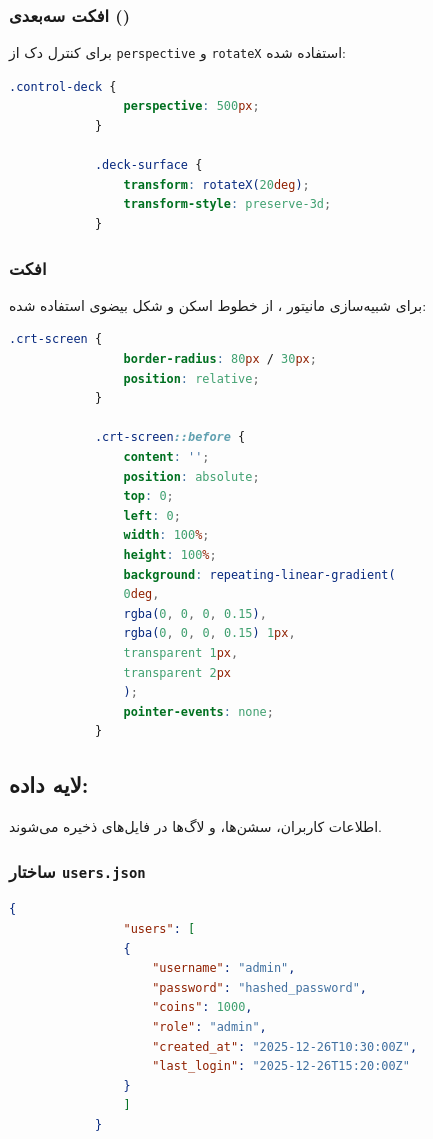 \documentclass[12pt,a4paper]{article}
\begin{document}
	\subsubsection{افکت سه‌بعدی ()}
	برای کنترل دک از \texttt{perspective} و \texttt{rotateX} استفاده شده:
	
	\begin{latin}
		\begin{lstlisting}[language=CSS, caption=افکت سه‌بعدی]
			.control-deck {
				perspective: 500px;
			}
			
			.deck-surface {
				transform: rotateX(20deg);
				transform-style: preserve-3d;
			}
		\end{lstlisting}
	\end{latin}
	
	\subsubsection{افکت }
	برای شبیه‌سازی مانیتور ، از خطوط اسکن و شکل بیضوی استفاده شده:
	
	\begin{latin}
		\begin{lstlisting}[language=CSS, caption=افکت CRT]
			.crt-screen {
				border-radius: 80px / 30px;
				position: relative;
			}
			
			.crt-screen::before {
				content: '';
				position: absolute;
				top: 0;
				left: 0;
				width: 100%;
				height: 100%;
				background: repeating-linear-gradient(
				0deg,
				rgba(0, 0, 0, 0.15),
				rgba(0, 0, 0, 0.15) 1px,
				transparent 1px,
				transparent 2px
				);
				pointer-events: none;
			}
		\end{lstlisting}
	\end{latin}
	
	\subsection{لایه داده: }
	اطلاعات کاربران، سشن‌ها، و لاگ‌ها در فایل‌های  ذخیره می‌شوند.
	
	\subsubsection{ساختار \texttt{users.json}}
	\begin{latin}
		\begin{lstlisting}[language=JSON, caption=ساختار users.json]
			{
				"users": [
				{
					"username": "admin",
					"password": "hashed_password",
					"coins": 1000,
					"role": "admin",
					"created_at": "2025-12-26T10:30:00Z",
					"last_login": "2025-12-26T15:20:00Z"
				}
				]
			}
		\end{lstlisting}
	\end{latin}
	
\end{document}
